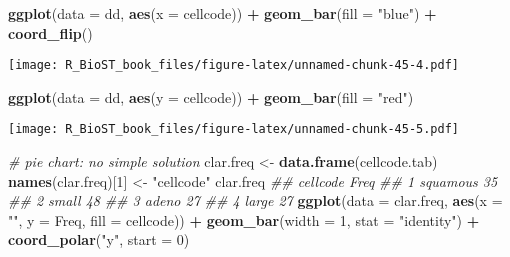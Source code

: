 \documentclass[
]{book}
\newenvironment{Shaded}{\begin{snugshade}}{\end{snugshade}}
\newcommand{\CommentTok}[1]{\textcolor[rgb]{0.56,0.35,0.01}{\textit{#1}}}
\newcommand{\DataTypeTok}[1]{\textcolor[rgb]{0.13,0.29,0.53}{#1}}
\newcommand{\DecValTok}[1]{\textcolor[rgb]{0.00,0.00,0.81}{#1}}
\newcommand{\KeywordTok}[1]{\textcolor[rgb]{0.13,0.29,0.53}{\textbf{#1}}}
\newcommand{\NormalTok}[1]{#1}
\newcommand{\OperatorTok}[1]{\textcolor[rgb]{0.81,0.36,0.00}{\textbf{#1}}}
\newcommand{\StringTok}[1]{\textcolor[rgb]{0.31,0.60,0.02}{#1}}
\begin{document}
\begin{Shaded}
\begin{Highlighting}[]
\KeywordTok{ggplot}\NormalTok{(}\DataTypeTok{data =}\NormalTok{ dd, }\KeywordTok{aes}\NormalTok{(}\DataTypeTok{x =}\NormalTok{ cellcode)) }\OperatorTok{+}
\StringTok{  }\KeywordTok{geom\_bar}\NormalTok{(}\DataTypeTok{fill =} \StringTok{"blue"}\NormalTok{) }\OperatorTok{+}\StringTok{ }
\StringTok{  }\KeywordTok{coord\_flip}\NormalTok{()}
\end{Highlighting}
\end{Shaded}

\texttt{[image: R\_BioST\_book\_files/figure-latex/unnamed-chunk-45-4.pdf]}

\begin{Shaded}
\begin{Highlighting}[]
\KeywordTok{ggplot}\NormalTok{(}\DataTypeTok{data =}\NormalTok{ dd, }\KeywordTok{aes}\NormalTok{(}\DataTypeTok{y =}\NormalTok{ cellcode)) }\OperatorTok{+}
\StringTok{  }\KeywordTok{geom\_bar}\NormalTok{(}\DataTypeTok{fill =} \StringTok{"red"}\NormalTok{) }
\end{Highlighting}
\end{Shaded}

\texttt{[image: R\_BioST\_book\_files/figure-latex/unnamed-chunk-45-5.pdf]}

\begin{Shaded}
\begin{Highlighting}[]
\CommentTok{\# pie chart: no simple solution}
\NormalTok{clar.freq \textless{}{-}}\StringTok{ }\KeywordTok{data.frame}\NormalTok{(cellcode.tab)}
\KeywordTok{names}\NormalTok{(clar.freq)[}\DecValTok{1}\NormalTok{] \textless{}{-}}\StringTok{ "cellcode"}
\NormalTok{clar.freq}
\CommentTok{\#\#   cellcode Freq}
\CommentTok{\#\# 1 squamous   35}
\CommentTok{\#\# 2    small   48}
\CommentTok{\#\# 3    adeno   27}
\CommentTok{\#\# 4    large   27}
\KeywordTok{ggplot}\NormalTok{(}\DataTypeTok{data =}\NormalTok{ clar.freq, }\KeywordTok{aes}\NormalTok{(}\DataTypeTok{x =} \StringTok{""}\NormalTok{, }\DataTypeTok{y =}\NormalTok{ Freq, }\DataTypeTok{fill =}\NormalTok{ cellcode)) }\OperatorTok{+}
\StringTok{  }\KeywordTok{geom\_bar}\NormalTok{(}\DataTypeTok{width =} \DecValTok{1}\NormalTok{, }\DataTypeTok{stat =} \StringTok{"identity"}\NormalTok{) }\OperatorTok{+}\StringTok{ }
\StringTok{  }\KeywordTok{coord\_polar}\NormalTok{(}\StringTok{"y"}\NormalTok{, }\DataTypeTok{start =} \DecValTok{0}\NormalTok{)}
\end{Highlighting}
\end{Shaded}
\end{document}
